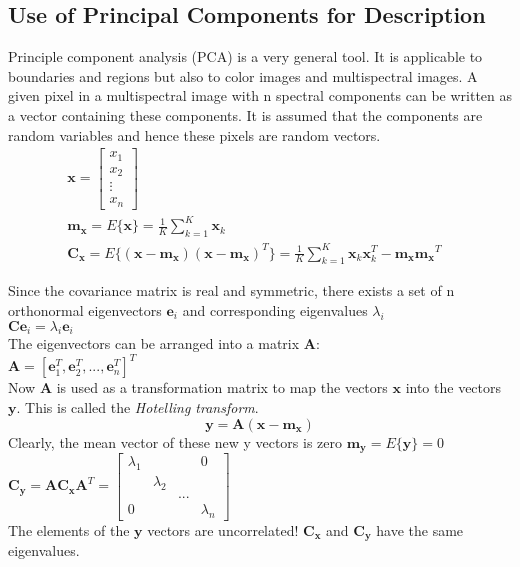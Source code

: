 \subsection{Use of Principal Components for Description}
Principle component analysis (PCA) is a very general tool. It is applicable to boundaries and regions but also to color images and multispectral images. A given pixel in a multispectral image with n spectral components can be written as a vector containing these components. It is assumed that the components are random variables and hence these pixels are random vectors.
\begin{align*}
& \mathbf{x} = \left[\begin{array}{c} x_1 \\ x_2 \\ \vdots \\ x_n \end{array}\right]&&\\
& \mathbf{m_x} = E\{\mathbf{x}\} = \frac{1}{K}\sum\limits_{k=1}^{K}\mathbf{x}_k&&\\
& \mathbf{C_x} = E\{(\mathbf{x}-\mathbf{m_x})(\mathbf{x}-\mathbf{m_x})^T\}=\frac{1}{K}\sum\limits_{k=1}^{K}\mathbf{x}_k\mathbf{x}_k^T-\mathbf{m_x}\mathbf{m_x}^T
\end{align*}

Since the covariance matrix is real and symmetric, there exists a set of n orthonormal eigenvectors $\mathbf{e}_i$ and corresponding eigenvalues $\lambda_i$\\
$\mathbf{C}\mathbf{e}_i=\lambda_i\mathbf{e}_i$\\
The eigenvectors can be arranged into a matrix $\mathbf{A}$:\\
$\mathbf{A}=[\mathbf{e}_1^T, \mathbf{e}_2^T, ..., \mathbf{e}_n^T]^T$\\
Now $\mathbf{A}$ is used as a transformation matrix to map the vectors $\mathbf{x}$ into the vectors $\mathbf{y}$. This is called the \emph{Hotelling transform}. \\
	\[
		\mathbf{y}=\mathbf{A}(\mathbf{x}-\mathbf{m_x})
	\]
Clearly, the mean vector of these new y vectors is zero $\mathbf{m_y}=E\{\mathbf{y}\}=0$\\
$\mathbf{C_y}=\mathbf{AC_xA}^T=\left[
\begin{matrix}
 \lambda_1 & & & 0 \\
 & \lambda_2 & & \\
 & & ... & \\
 0 & & & \lambda_n
\end{matrix}\right]	$\\
The elements of the $\mathbf{y}$ vectors are uncorrelated! $\mathbf{C_x}$ and $\mathbf{C_y}$ have the same eigenvalues.

